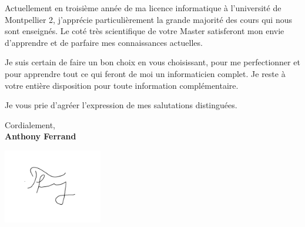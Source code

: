\documentclass[11pt]{article}
\begin{document}
Actuellement en troisième année de ma licence informatique à l'université de Montpellier 2,  j'apprécie particulièrement la grande majorité des cours qui nous sont enseignés. Le coté très scientifique de votre Master satisferont mon envie d'apprendre et de parfaire mes connaissances actuelles.

Je suis certain de faire un bon choix en vous choisissant, pour me perfectionner et pour apprendre tout ce qui feront de moi un informaticien complet. 
Je reste à votre entière disposition pour toute information complémentaire.

Je vous prie d'agréer l'expression de mes salutations distinguées.

Cordialement,\\[1em]

{\bfseries Anthony Ferrand}\\

\raggedright{\includegraphics[width=43mm]{signature.png}}
\end{document}
